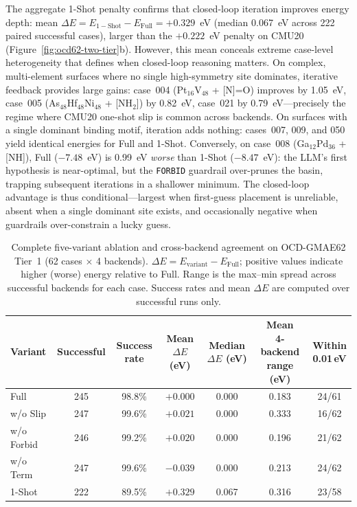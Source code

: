 The aggregate 1-Shot penalty confirms that closed-loop iteration improves energy depth: mean $\Delta E = E_{\mathrm{1-Shot}} - E_{\mathrm{Full}} = +0.329$~eV (median 0.067~eV across 222 paired successful cases), larger than the $+0.222$~eV penalty on CMU20 (Figure~\ref{fig:ocd62-two-tier}b).
However, this mean conceals extreme case-level heterogeneity that defines when closed-loop reasoning matters.
On complex, multi-element surfaces where no single high-symmetry site dominates, iterative feedback provides large gains: case~004 (Pt$_{16}$V$_{48}$ + [N]=O) improves by 1.05~eV, case~005 (As$_{48}$Hf$_{48}$Ni$_{48}$ + [NH$_2$]) by 0.82~eV, case~021 by 0.79~eV---precisely the regime where CMU20 one-shot slip is common across backends.
On surfaces with a single dominant binding motif, iteration adds nothing: cases~007, 009, and 050 yield identical energies for Full and 1-Shot.
Conversely, on case~008 (Ga$_{12}$Pd$_{36}$ + [NH]), Full ($-7.48$~eV) is 0.99~eV \emph{worse} than 1-Shot ($-8.47$~eV): the LLM's first hypothesis is near-optimal, but the \texttt{FORBID} guardrail over-prunes the basin, trapping subsequent iterations in a shallower minimum.
The closed-loop advantage is thus conditional---largest when first-guess placement is unreliable, absent when a single dominant site exists, and occasionally negative when guardrails over-constrain a lucky guess.

\begin{table}[t]
\centering
\caption{Complete five-variant ablation and cross-backend agreement on OCD-GMAE62 Tier~1 (62 cases $\times$ 4 backends). $\Delta E = E_{\mathrm{variant}} - E_{\mathrm{Full}}$; positive values indicate higher (worse) energy relative to Full. Range is the max--min spread across successful backends for each case. Success rates and mean $\Delta E$ are computed over successful runs only.}
\label{tab:ocd62-tier1-full}
\begin{tabular}{lcccccc}
\toprule
Variant & Successful & Success rate & \makecell{Mean \\ $\Delta E$ (eV)} & \makecell{Median \\ $\Delta E$ (eV)} & \makecell{Mean \\ 4-backend range (eV)} & \makecell{Within \\ 0.01\,eV} \\
\midrule
Full      & 245 & 98.8\% & $+0.000$ & 0.000 & 0.183 & 24/61 \\
w/o Slip & 247 & 99.6\% & $+0.021$ & $0.000$ & 0.333 & 16/62 \\
w/o Forbid & 246 & 99.2\% & $+0.020$ & $0.000$ & 0.196 & 21/62 \\
w/o Term & 247 & 99.6\% & $-0.039$ & $0.000$ & 0.213 & 24/62 \\
1-Shot    & 222 & 89.5\% & $+0.329$ & 0.067 & 0.316 & 23/58 \\
\bottomrule
\end{tabular}
\end{table}

